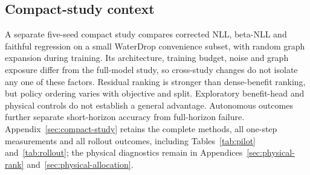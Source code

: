 \subsection{Compact-study context}
A separate five-seed compact study compares corrected NLL, beta-NLL and
faithful regression on a small WaterDrop convenience subset, with random
graph expansion during training. Its architecture, training budget, noise
and graph exposure differ from the full-model study, so cross-study changes
do not isolate any one of these factors. Residual ranking is stronger than
dense-benefit ranking, but policy ordering varies with objective and split.
Exploratory benefit-head and physical controls do not establish a general
advantage. Autonomous outcomes further separate short-horizon accuracy from
full-horizon failure. Appendix~\ref{sec:compact-study} retains the complete
methods, all one-step measurements and all rollout outcomes, including
Tables~\ref{tab:pilot} and~\ref{tab:rollout}; the physical diagnostics remain
in Appendices~\ref{sec:physical-rank} and~\ref{sec:physical-allocation}.

